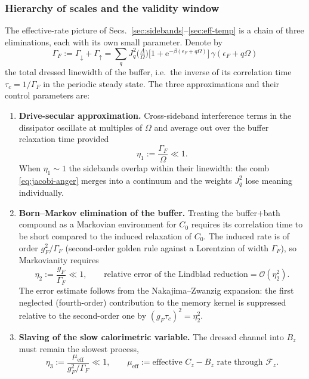 \documentclass[11pt,a4paper]{article}
\theoremstyle{definition}
\theoremstyle{remark}
\newcommand{\ee}{\mathrm{e}}
\begin{document}
\subsubsection{Hierarchy of scales and the validity window}
\label{sec:hierarchy}
The effective-rate picture of Secs.~\ref{sec:sidebands}--\ref{sec:eff-temp}
is a chain of three eliminations, each with its own small parameter.
Denote by
\begin{equation}
\Gamma_F := \Gamma_\downarrow + \Gamma_\uparrow
= \sum_q J_q^2\!\Big(\tfrac{A}{\Omega}\Big)
\Big[1+\ee^{-\beta(\epsilon_F+q\Omega)}\Big]\,
\gamma(\epsilon_F+q\Omega)
\label{eq:GammaF}
\end{equation}
the total dressed linewidth of the buffer, i.e.\ the inverse of its
correlation time $\tau_c = 1/\Gamma_F$ in the periodic steady state.
The three approximations and their control parameters are:
\begin{enumerate}[label=(V\arabic*),leftmargin=*]
\item \textbf{Drive-secular approximation.} Cross-sideband
interference terms in the dissipator oscillate at multiples of
$\Omega$ and average out over the buffer relaxation time provided
\begin{equation}
\eta_1 := \frac{\Gamma_F}{\Omega} \ll 1 .
\end{equation}
When $\eta_1\sim 1$ the sidebands overlap within their linewidth: the
comb \eqref{eq:jacobi-anger} merges into a continuum and the weights
$J_q^2$ lose meaning individually.
\item \textbf{Born--Markov elimination of the buffer.} Treating the
buffer$+$bath compound as a Markovian environment for $C_0$ requires
its correlation time to be short compared to the induced relaxation of
$C_0$. The induced rate is of order $g_F^2/\Gamma_F$
(second-order golden rule against a Lorentzian of width $\Gamma_F$), so
Markovianity requires
\begin{equation}
\eta_2 := \frac{g_F}{\Gamma_F} \ll 1 ,
\qquad
\text{relative error of the Lindblad reduction} = \mathcal{O}(\eta_2^{2}).
\label{eq:markov-error}
\end{equation}
The error estimate follows from the Nakajima--Zwanzig expansion: the
first neglected (fourth-order) contribution to the memory kernel is
suppressed relative to the second-order one by
$(g_F\tau_c)^2 = \eta_2^2$.
\item \textbf{Slaving of the slow calorimetric variable.} The dressed
channel into $B_z$ must remain the slowest process,
\begin{equation}
\eta_3 := \frac{\mu_{\mathrm{eff}}}{g_F^2/\Gamma_F} \ll 1,
\qquad
\mu_{\mathrm{eff}} := \text{effective } C_z\!-\!B_z \text{ rate through } \mathcal{F}_z .
\end{equation}
\end{enumerate}
\end{document}
